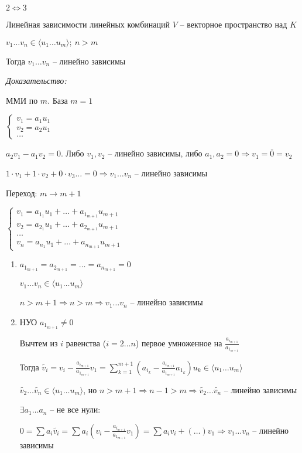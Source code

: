 \documentclass[12pt]{article}
\newcommand{\q}[1]{\langle #1 \rangle}
\begin{document}
\begin{Exercise}{}
    $2 \Leftrightarrow 3$
\end{Exercise}

\begin{lem}{Линейная зависимости линейных комбинаций}
    $V$ -- векторное пространство над $K$

    $v_1 \ldots v_n \in \q{u_1 \ldots u_m};\ n > m$

    Тогда $v_1 \ldots v_n$ -- линейно зависимы
\end{lem}

\textit{Доказательство:}

ММИ по $m$. База $m = 1$

$\begin{cases}
    v_1 = a_1u_1 \\
    v_2 = a_2u_1 \\
    \ldots
\end{cases}$

$a_2v_1 - a_1v_2 = 0$. Либо $v_1, v_2$ -- линейно зависимы, либо $a_1, a_2 = 0 \Rightarrow v_1 = \overline{0} = v_2$

$1 \cdot v_1 + 1 \cdot v_2 + 0 \cdot v_3 \ldots = 0 \Rightarrow v_1 \ldots v_n$ -- линейно зависимы

Переход: $m \rightarrow m + 1$

$\begin{cases}
    v_1 = a_{1_1}u_1 + \ldots + a_{1_{m + 1}}u_{m + 1} \\
    v_2 = a_{2_1}u_1 + \ldots + a_{2_{m + 1}}u_{m + 1} \\
    \ldots \\
    v_n = a_{n_1}u_1 + \ldots + a_{n_{m + 1}}u_{m + 1}
\end{cases}$

\begin{enumerate}
    \item $a_{1_{m + 1}} = a_{2_{m + 1}} = \ldots = a_{n_{m + 1}} = 0$

    $v_1 \ldots v_n \in \q{u_1 \ldots u_m}$

    $n > m + 1 \Rightarrow n > m \Rightarrow v_1 \ldots v_n$ -- линейно зависимы

    \item НУО $a_{1_{m + 1}} \neq 0$
    
    Вычтем из $i$ равенства ($i = 2 \ldots n$) первое умноженное на $\frac{a_{i_{m + 1}}}{a_{1_{m + 1}}}$

    Тогда $\tilde{v_i} = v_i - \frac{a_{i_{m + 1}}}{a_{1_{m + 1}}}v_1 = \sum\limits_{k = 1}^{m + 1} (a_{i_k} - \frac{a_{i_{m + 1}}}{a_{1_{m + 1}}}a_{1_k})u_k \in \q{u_1 \ldots u_m}$

    $\tilde{v_2} \ldots \tilde{v_n} \in \q{u_1 \ldots u_m}$, но $n > m + 1 \Rightarrow n - 1 > m \Rightarrow \tilde{v_2} \ldots \tilde{v_n}$ -- линейно зависимы

    $\exists a_1 \ldots a_n$ -- не все нули:

    $0 = \sum a_i \tilde{v_i} = \sum a_i(v_i - \frac{a_{i_{m + 1}}}{a_{1_{m + 1}}}v_1) = \sum a_iv_i + (\ldots)v_1 \Rightarrow v_1 \ldots v_n$ -- линейно зависимы
\end{enumerate}
\end{document}
